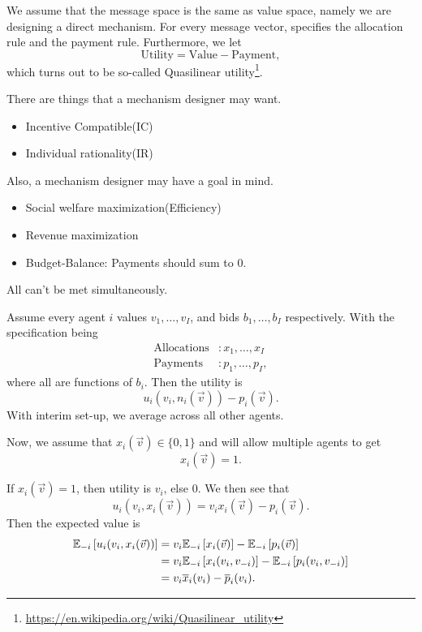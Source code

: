 \hr

We assume that the message space is the same as value space, namely we are designing a direct mechanism. For every message vector, specifies the
allocation rule and the payment rule. Furthermore, we let
\[
	\text{Utility} = \text{Value} - \text{Payment},
\]
which turns out to be so-called Quasilinear utility\footnote{\url{https://en.wikipedia.org/wiki/Quasilinear_utility}}.

\begin{note}
	There are things that a mechanism designer may want.
	\begin{itemize}
		\item Incentive Compatible(IC)
		\item Individual rationality(IR)
	\end{itemize}
	Also, a mechanism designer may have a goal in mind.
	\begin{itemize}
		\item Social welfare maximization(Efficiency)
		\item Revenue maximization
		\item Budget-Balance: Payments should sum to \(0\).
	\end{itemize}

	\begin{remark}
		All can't be met simultaneously.
	\end{remark}
\end{note}

Assume every agent \(i\) values \(v_1, \ldots , v_{I}\), and bids \(b_1, \ldots , b_{I}\) respectively. With the specification being
\[
	\begin{split}
		\text{Allocations}&: x_1, \ldots , x_I\\
		\text{Payments}&:p_1, \ldots , p_I,
	\end{split}
\]
where all are functions of \(b_{i}\). Then the utility is
\[
	u_{i}(v_{i}, n_{i}(\vec{v})) - p_{i}(\vec{v}).
\]
With interim set-up, we average across all other agents.

Now, we assume that \(x_{i}(\vec{v})\in\{0, 1\}\) and will allow multiple agents to get
\[
	x_{i}(\vec{v}) = 1.
\]

If \(x_{i}(\vec{v})=1\), then utility is \(v_{i}\), else \(0\). We then see that
\[
	u_{i}(v_{i}, x_{i}(\vec{v})) = v_{i}x_{i}(\vec{v}) - p_{i}(\vec{v}).
\]
Then the expected value is
\[
	\begin{split}
		\mathbb{\MakeUppercase{E}}_{-i}\left[u_{i}(v_{i}, x_{i}(\vec{v}))\right] &= v_{i} \mathbb{\MakeUppercase{E}}_{-i}\left[x_{i}(\vec{v})\right] - \mathbb{\MakeUppercase{E}}_{-i}\left[p_{i}(\vec{v})\right]\\
		&= v_{i} \mathbb{\MakeUppercase{E}}_{-i}\left[x_{i}(v_{i}, v_{-i})\right] - \mathbb{\MakeUppercase{E}}_{-i}\left[p_{i}(v_{i}, v_{-i})\right]\\
		&= v_{i} \overline{x}_{i}(v_{i})-\overline{p}_{i}(v_{i}).
	\end{split}
\]

